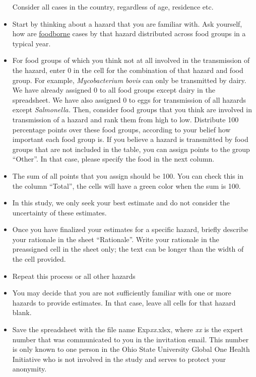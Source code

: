 \documentclass[
  letterpaper,
  DIV=11,
  numbers=noendperiod]{scrartcl}
\begin{document}
\begin{itemize}
  Consider all cases in the country, regardless of age, residence etc.
\item
  Start by thinking about a hazard that you are familiar with. Ask
  yourself, how are \ul{foodborne} cases by that hazard distributed
  across food groups in a typical year.
\item
  For food groups of which you think not at all involved in the
  transmission of the hazard, enter 0 in the cell for the combination of
  that hazard and food group. For example, \emph{Mycobacterium bovis}
  can only be transmitted by dairy. We have already assigned 0 to all
  food groups except dairy in the spreadsheet. We have also assigned 0
  to eggs for transmission of all hazards except \emph{Salmonella.}
  Then, consider food groups that you think are involved in transmission
  of a hazard and rank them from high to low. Distribute 100 percentage
  points over these food groups, according to your belief how important
  each food group is. If you believe a hazard is transmitted by food
  groups that are not included in the table, you can assign points to
  the group ``Other''. In that case, please specify the food in the next
  column.
\item
  The sum of all points that you assign should be 100. You can check
  this in the column ``Total'', the cells will have a green color when
  the sum is 100.
\item
  In this study, we only seek your best estimate and do not consider the
  uncertainty of these estimates.
\item
  Once you have finalized your estimates for a specific hazard, briefly
  describe your rationale in the sheet ``Rationale''. Write your
  rationale in the preassigned cell in the sheet only; the text can be
  longer than the width of the cell provided.
\item
  Repeat this process or all other hazards
\item
  You may decide that you are not sufficiently familiar with one or more
  hazards to provide estimates. In that case, leave all cells for that
  hazard blank.
\item
  Save the spreadsheet with the file name Exp\emph{xx}.xlsx, where
  \emph{xx} is the expert number that was communicated to you in the
  invitation email. This number is only known to one person in the Ohio
  State University Global One Health Initiative who is not involved in
  the study and serves to protect your anonymity.
\end{itemize}
\end{document}

